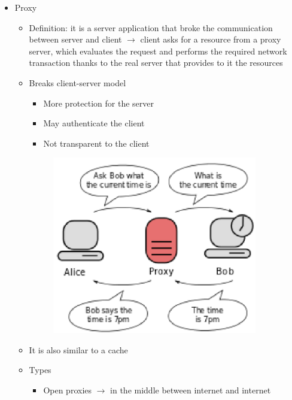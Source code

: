 \documentclass{article}
\begin{document}
\begin{itemize}
\begin{itemize}
\begin{figure}[h]
       \end{figure}
    \end{itemize}
  \item Proxy
    \begin{itemize}
      \item Definition: it is a server application that broke the communication between server and client $\rightarrow$ client asks for a resource from a proxy server, which evaluates the request and performs the required network transaction thanks to the real server that provides to it the resources
      \item Breaks client-server model
        \begin{itemize}
          \item More protection for the server
          \item May authenticate the client
          \item Not transparent to the client
        \end{itemize}
        \begin{figure}[h]
            \centering
            \includegraphics[width=0.90\textwidth]{figure/proxy.png}
        \end{figure}
      \item It is also similar to a cache
      \item Types
        \begin{itemize}
          \item Open proxies $\rightarrow$ in the middle between internet and internet

\end{itemize}
\end{itemize}
\end{itemize}
\end{document}

